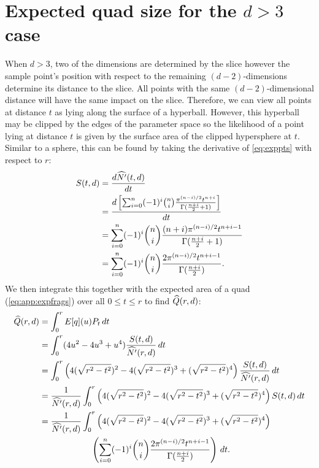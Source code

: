 \section{Expected quad size for the $d>3$ case}


When $d>3$, two of the dimensions are determined by the slice however the
sample point's position with respect to the remaining $(d-2)$-dimensions 
determine its distance to the slice.  All points with the same 
$(d-2)$-dimensional distance will have the same impact on the slice.
Therefore, we can view all points at distance $t$ as lying along the surface 
of a hyperball.  However, this hyperball may be clipped by the edges of the
parameter space so the likelihood of a point lying at distance $t$ is given
by the surface area of the clipped hypersphere at $t$.  Similar to a sphere,
this can be found by taking the derivative of \autoref{eq:exppts} with 
respect to $r$:
\begin{align*}
 S(t,d) 
   &= \frac{d \widehat{N'}(t, d)}{d t} \\
   &= \frac{d \left[
    \sum_{i=0}^{n} (-1)^{i} {n \choose i}
         \frac{\pi^{(n-i)/2}t^{n+i}}{\Gamma(\frac{n+i}{2} + 1)} 
 \right]}{dt} \\
   &= \sum_{i=0}^{n} (-1)^{i} {n \choose i}
         \frac{(n+i)\pi^{(n-i)/2}t^{n+i-1}}{\Gamma(\frac{n+i}{2} + 1)} \\
   &= \sum_{i=0}^{n} (-1)^{i} {n \choose i}
         \frac{2\pi^{(n-i)/2}t^{n+i-1}}{\Gamma(\frac{n+i}{2})} 
         \text{.}
\end{align*}
We then integrate this
together with the expected area of a quad (\autoref{eq:app:expfrags}) over
all $0 \le t \le r$ to find $\widehat{Q}(r,d)$:
\begin{align*}
\widehat{Q}(r,d) &= \int_0^r E[q](u) P_t \, dt \\
     &= \int_0^r (4u^2 - 4u^3 + u^4)
        \frac{S(t,d)}{\widehat{N'}(r, d)} \, dt \\
     &= \int_0^r 
        \left(4(\sqrt{r^2-t^2})^2 - 4(\sqrt{r^2-t^2})^3 + (\sqrt{r^2-t^2})^4\right)
        \frac{S(t,d)}{\widehat{N'}(r, d)} \, dt \\
     &= \frac{1}{\widehat{N'}(r, d)} \int_0^r 
        \left(4(\sqrt{r^2-t^2})^2 - 4(\sqrt{r^2-t^2})^3 + (\sqrt{r^2-t^2})^4\right)
        S(t,d) \, dt \\
     &= \frac{1}{\widehat{N'}(r, d)} \int_0^r 
        \left(4(\sqrt{r^2-t^2})^2 - 4(\sqrt{r^2-t^2})^3 + (\sqrt{r^2-t^2})^4\right) \\
     &\qquad\qquad\qquad
       \left(
           \sum_{i=0}^{n} (-1)^{i} {n \choose i}
               \frac{2\pi^{(n-i)/2}t^{n+i-1}}{\Gamma(\frac{n+i}{2})} 
        \right) \, dt 
        \text{.}
\end{align*}


